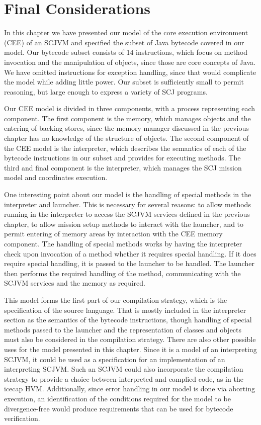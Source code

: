 \section{Final Considerations}
\label{cee-final-considerations-section}

In this chapter we have presented our model of the core execution
environment (CEE) of an SCJVM and specified the subset of Java
bytecode covered in our model.
Our bytecode subset consists of 14 instructions, which focus on method
invocation and the manipulation of objects, since those are core
concepts of Java.
We have omitted instructions for exception handling, since that would
complicate the model while adding little power.
Our subset is sufficiently small to permit reasoning, but large enough
to express a variety of SCJ programs.

Our CEE model is divided in three components, with a \Circus{} process
representing each component.
The first component is the memory, which manages objects and the
entering of backing stores, since the memory manager discussed in the
previous chapter has no knowledge of the structure of objects.
The second component of the CEE model is the interpreter, which
describes the semantics of each of the bytecode instructions in our
subset and provides for executing methods.
The third and final component is the interpreter, which manages the
SCJ mission model and coordinates execution.

One interesting point about our model is the handling of special
methods in the interpreter and launcher.
This is necessary for several reasons: to allow methods running in the
interpreter to access the SCJVM services defined in the previous
chapter, to allow mission setup methods to interact with the launcher,
and to permit entering of memory areas by interaction with the CEE
memory component.
The handling of special methods works by having the interpreter check
upon invocation of a method whether it requires special handling.
If it does require special handling, it is passed to the launcher to
be handled.
The launcher then performs the required handling of the method,
communicating with the SCJVM services and the memory as required.

This model forms the first part of our compilation strategy, which is
the specification of the source language.
That is mostly included in the interpreter section as the semantics of
the bytecode instructions, though handling of special methods passed
to the launcher and the representation of classes and objects must
also be considered in the compilation strategy.
There are also other possible uses for the model presented in this
chapter.
Since it is a model of an interpreting SCJVM, it could be used as a
specification for an implementation of an interpreting SCJVM.
Such an SCJVM could also incorporate the compilation strategy to
provide a choice between interpreted and complied code, as in the
icecap HVM.
Additionally, since error handling in our model is done via aborting
execution, an identification of the conditions required for the model
to be divergence-free would produce requirements that can be used for
bytecode verification.
